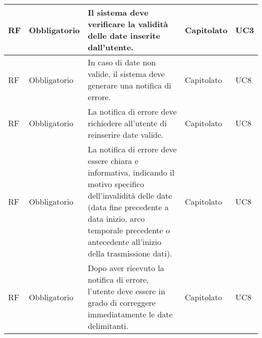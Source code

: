 \begin{longtable}{|C{1cm}|C{2cm}|>{\raggedright}m{5cm}|C{2cm}|C{1.5cm}|}
     RF & Obbligatorio        & Il sistema deve verificare la validità delle date inserite dall'utente.
                                                   & Capitolato          & UC3                                                                                                                                                                                                                                                                      \\
    \hline
     RF & Obbligatorio        & In caso di date non valide, il sistema deve generare una notifica di errore.
                                                   & Capitolato          & UC8                                                                                                                                                                                                                                                                      \\
    \hline
     RF & Obbligatorio        & La notifica di errore deve richiedere all'utente di reinserire date valide.
                                                   & Capitolato          & UC8                                                                                                                                                                                                                                                                      \\
    \hline
     RF & Obbligatorio        & La notifica di errore deve essere chiara e informativa, indicando il motivo specifico dell'invalidità delle date (data fine precedente a data inizio, arco temporale precedente o antecedente all'inizio della trasmissione dati).
                                                   & Capitolato          & UC8                                                                                                                                                                                                                                                                      \\
    \hline
     RF & Obbligatorio        & Dopo aver ricevuto la notifica di errore, l'utente deve essere in grado di correggere immediatamente le date delimitanti.
                                                   & Capitolato          & UC8                                                                                                                                                                                                                                                                      \\


\end{longtable}
